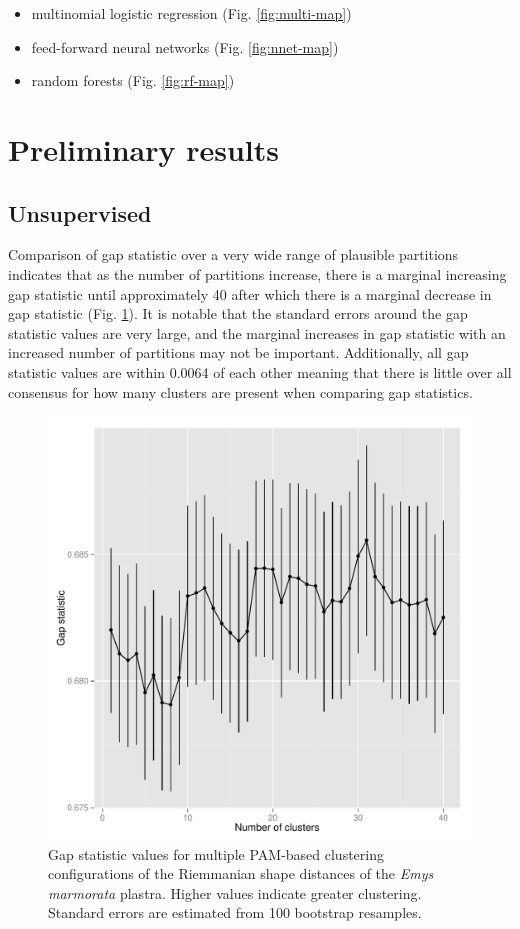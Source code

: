 \documentclass{article}\usepackage{graphicx, color}
\begin{document}
\begin{itemize}
  \item multinomial logistic regression (Fig. \ref{fig:multi-map})
  \item feed-forward neural networks (Fig. \ref{fig:nnet-map})
  \item random forests (Fig. \ref{fig:rf-map})
\end{itemize}


\section{Preliminary results}
\subsection{Unsupervised}
Comparison of gap statistic over a very wide range of plausible partitions indicates that as the number of partitions increase, there is a marginal increasing gap statistic until approximately 40 after which there is a marginal decrease in gap statistic (Fig. \ref{fig:gap}). It is notable that the standard errors around the gap statistic values are very large, and the marginal increases in gap statistic with an increased number of partitions may not be important. Additionally, all gap statistic values are within 0.0064 of each other meaning that there is little over all consensus for how many clusters are present when comparing gap statistics.



\begin{figure}[ht]
  \centering
  \includegraphics[width = \textwidth, keepaspectratio = true]{figure/gap}
  \caption{Gap statistic values for multiple PAM-based clustering configurations of the Riemmanian shape distances of the \textit{Emys marmorata} plastra. Higher values indicate greater clustering. Standard errors are estimated from 100 bootstrap resamples.}
  \label{fig:gap}
\end{figure}
\end{document}
